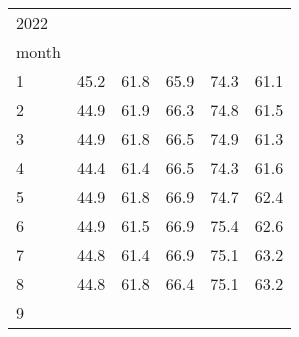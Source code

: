 \begin{tabular}{llllll}
\multicolumn{1}{l}{\hspace{1em}2022} &
  \multicolumn{1}{|r}{} &
  \multicolumn{1}{r}{} &
  \multicolumn{1}{r}{} &
  \multicolumn{1}{r}{} &
  \multicolumn{1}{r}{} \\
\multicolumn{1}{l}{\hspace{2em}month} &
  \multicolumn{1}{|r}{} &
  \multicolumn{1}{r}{} &
  \multicolumn{1}{r}{} &
  \multicolumn{1}{r}{} &
  \multicolumn{1}{r}{} \\
\multicolumn{1}{l}{\hspace{3em}1} &
  \multicolumn{1}{|r}{45.2} &
  \multicolumn{1}{r}{61.8} &
  \multicolumn{1}{r}{65.9} &
  \multicolumn{1}{r}{74.3} &
  \multicolumn{1}{r}{61.1} \\
\multicolumn{1}{l}{\hspace{3em}2} &
  \multicolumn{1}{|r}{44.9} &
  \multicolumn{1}{r}{61.9} &
  \multicolumn{1}{r}{66.3} &
  \multicolumn{1}{r}{74.8} &
  \multicolumn{1}{r}{61.5} \\
\multicolumn{1}{l}{\hspace{3em}3} &
  \multicolumn{1}{|r}{44.9} &
  \multicolumn{1}{r}{61.8} &
  \multicolumn{1}{r}{66.5} &
  \multicolumn{1}{r}{74.9} &
  \multicolumn{1}{r}{61.3} \\
\multicolumn{1}{l}{\hspace{3em}4} &
  \multicolumn{1}{|r}{44.4} &
  \multicolumn{1}{r}{61.4} &
  \multicolumn{1}{r}{66.5} &
  \multicolumn{1}{r}{74.3} &
  \multicolumn{1}{r}{61.6} \\
\multicolumn{1}{l}{\hspace{3em}5} &
  \multicolumn{1}{|r}{44.9} &
  \multicolumn{1}{r}{61.8} &
  \multicolumn{1}{r}{66.9} &
  \multicolumn{1}{r}{74.7} &
  \multicolumn{1}{r}{62.4} \\
\multicolumn{1}{l}{\hspace{3em}6} &
  \multicolumn{1}{|r}{44.9} &
  \multicolumn{1}{r}{61.5} &
  \multicolumn{1}{r}{66.9} &
  \multicolumn{1}{r}{75.4} &
  \multicolumn{1}{r}{62.6} \\
\multicolumn{1}{l}{\hspace{3em}7} &
  \multicolumn{1}{|r}{44.8} &
  \multicolumn{1}{r}{61.4} &
  \multicolumn{1}{r}{66.9} &
  \multicolumn{1}{r}{75.1} &
  \multicolumn{1}{r}{63.2} \\
\multicolumn{1}{l}{\hspace{3em}8} &
  \multicolumn{1}{|r}{44.8} &
  \multicolumn{1}{r}{61.8} &
  \multicolumn{1}{r}{66.4} &
  \multicolumn{1}{r}{75.1} &
  \multicolumn{1}{r}{63.2} \\
\multicolumn{1}{l}{\hspace{3em}9} &

\end{tabular}
